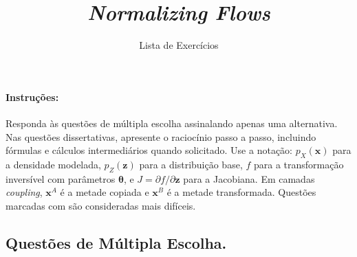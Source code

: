 \documentclass{dlproblemset}
\title{\textit{Normalizing Flows}}
\subtitle{Lista de Exercícios}
\newcommand{\thetav}{\boldsymbol{\theta}}
\begin{document}
\paragraph{Instruções:} Responda às questões de múltipla escolha assinalando apenas uma alternativa. Nas questões dissertativas, apresente o raciocínio passo a passo, incluindo fórmulas e cálculos intermediários quando solicitado. Use a notação: $p_X(\mathbf{x})$ para a densidade modelada, $p_Z(\mathbf{z})$ para a distribuição base, $f$ para a transformação inversível com parâmetros $\thetav$, e $J = \partial f / \partial \mathbf{z}$ para a Jacobiana. Em camadas \textit{coupling}, $\mathbf{x}^A$ é a metade copiada e $\mathbf{x}^B$ é a metade transformada. Questões marcadas com  são consideradas mais difíceis.

\subsection*{Questões de Múltipla Escolha.}
\end{document}
